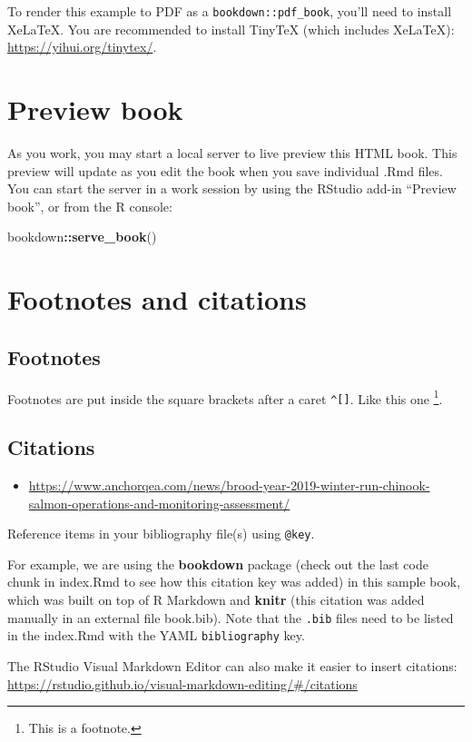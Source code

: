 \documentclass[
]{book}
\newenvironment{Shaded}{\begin{snugshade}}{\end{snugshade}}
\newcommand{\FunctionTok}[1]{\textcolor[rgb]{0.13,0.29,0.53}{\textbf{#1}}}
\newcommand{\NormalTok}[1]{#1}
\newcommand{\SpecialCharTok}[1]{\textcolor[rgb]{0.81,0.36,0.00}{\textbf{#1}}}
\providecommand{\tightlist}{%
  \setlength{\itemsep}{0pt}\setlength{\parskip}{0pt}}
\theoremstyle{definition}
\theoremstyle{definition}
\theoremstyle{definition}
\theoremstyle{definition}
\theoremstyle{remark}
\begin{document}
To render this example to PDF as a \texttt{bookdown::pdf\_book}, you'll need to install XeLaTeX. You are recommended to install TinyTeX (which includes XeLaTeX): \url{https://yihui.org/tinytex/}.

\hypertarget{preview-book}{%
\section{Preview book}\label{preview-book}}

As you work, you may start a local server to live preview this HTML book. This preview will update as you edit the book when you save individual .Rmd files. You can start the server in a work session by using the RStudio add-in ``Preview book'', or from the R console:

\begin{Shaded}
\begin{Highlighting}[]
\NormalTok{bookdown}\SpecialCharTok{::}\FunctionTok{serve\_book}\NormalTok{()}
\end{Highlighting}
\end{Shaded}

\hypertarget{footnotes-and-citations-1}{%
\section{Footnotes and citations}\label{footnotes-and-citations-1}}

\hypertarget{footnotes-1}{%
\subsection{Footnotes}\label{footnotes-1}}

Footnotes are put inside the square brackets after a caret \texttt{\^{}{[}{]}}. Like this one \footnote{This is a footnote.}.

\hypertarget{citations-1}{%
\subsection{Citations}\label{citations-1}}

\begin{itemize}
\tightlist
\item
  \url{https://www.anchorqea.com/news/brood-year-2019-winter-run-chinook-salmon-operations-and-monitoring-assessment/}
\end{itemize}

Reference items in your bibliography file(s) using \texttt{@key}.

For example, we are using the \textbf{bookdown} package \citep{R-bookdown} (check out the last code chunk in index.Rmd to see how this citation key was added) in this sample book, which was built on top of R Markdown and \textbf{knitr} \citep{xie2015} (this citation was added manually in an external file book.bib). Note that the \texttt{.bib} files need to be listed in the index.Rmd with the YAML \texttt{bibliography} key.

The RStudio Visual Markdown Editor can also make it easier to insert citations: \url{https://rstudio.github.io/visual-markdown-editing/\#/citations}

  
\end{document}

